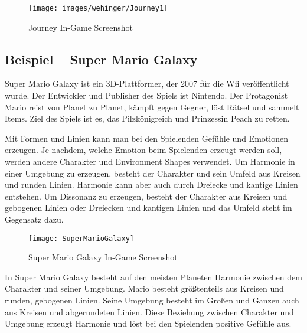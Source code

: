 \begin{figure}[H]
	\centering
	\texttt{[image: images/wehinger/Journey1]}
	\caption{Journey In-Game Screenshot \cite{_journey}}
\end{figure}

\subsection{Beispiel – Super Mario Galaxy}
Super Mario Galaxy ist ein 3D-Plattformer, der 2007 für die Wii veröffentlicht wurde. Der Entwickler und Publisher des Spiels ist Nintendo. Der Protagonist Mario reist von Planet zu Planet, kämpft gegen Gegner, löst Rätsel und sammelt Items. Ziel des Spiels ist es, das Pilzkönigreich und Prinzessin Peach zu retten. 
\cite{_super_mario_galaxy}

Mit Formen und Linien kann man bei den Spielenden Gefühle und Emotionen erzeugen. Je nachdem, welche Emotion beim Spielenden erzeugt werden soll, werden andere Charakter und Environment Shapes verwendet. Um Harmonie in einer Umgebung zu erzeugen, besteht der Charakter und sein Umfeld aus Kreisen und runden Linien. Harmonie kann aber auch durch Dreiecke und kantige Linien entstehen. Um Dissonanz zu erzeugen, besteht der Charakter aus Kreisen und gebogenen Linien oder Dreiecken und kantigen Linien und das Umfeld steht im Gegensatz dazu.
\cite{_drawing_basics_and_video_game_art}

\begin{figure}[H]
	\centering
	\texttt{[image: SuperMarioGalaxy]}
	\caption{Super Mario Galaxy In-Game Screenshot\cite{_drawing_basics_and_video_game_art}}
\end{figure}

In Super Mario Galaxy besteht auf den meisten Planeten Harmonie zwischen dem Charakter und seiner Umgebung. Mario besteht größtenteils aus Kreisen und runden, gebogenen Linien. Seine Umgebung besteht im Großen und Ganzen auch aus Kreisen und abgerundeten Linien. Diese Beziehung zwischen Charakter und Umgebung erzeugt Harmonie und löst bei den Spielenden positive Gefühle aus. 
\cite{_drawing_basics_and_video_game_art}



